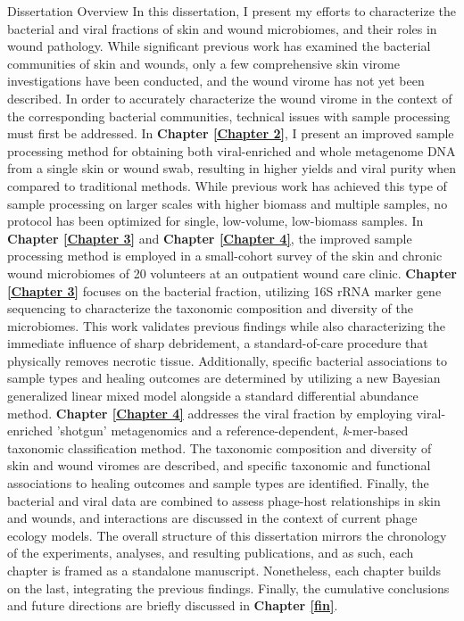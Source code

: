 \documentclass[oneside,12pt,final]{sty/ucthesis-CA2012}
\begin{document}
\begin{mainmatter}
\begin{section}{Dissertation Overview}
In this dissertation, I present my efforts to characterize the bacterial and viral fractions of skin and wound microbiomes, and their roles in wound pathology. While significant previous work has examined the bacterial communities of skin and wounds, only a few comprehensive skin virome investigations have been conducted, and the wound virome has not yet been described. In order to accurately characterize the wound virome in the context of the corresponding bacterial communities, technical issues with sample processing must first be addressed. In \textbf{Chapter \ref{Chapter 2}}, I present an improved sample processing method for obtaining both viral-enriched and whole metagenome DNA from a single skin or wound swab, resulting in higher yields and viral purity when compared to traditional methods. While previous work has achieved this type of sample processing on larger scales with higher biomass and multiple samples, no protocol has been optimized for single, low-volume, low-biomass samples. In \textbf{Chapter \ref{Chapter 3}} and \textbf{Chapter \ref{Chapter 4}}, the improved sample processing method is employed in a small-cohort survey of the skin and chronic wound microbiomes of 20 volunteers at an outpatient wound care clinic. \textbf{Chapter \ref{Chapter 3}} focuses on the bacterial fraction, utilizing 16S rRNA marker gene sequencing to characterize the taxonomic composition and diversity of the microbiomes. This work validates previous findings while also characterizing the immediate influence of sharp debridement, a standard-of-care procedure that physically removes necrotic tissue. Additionally, specific bacterial associations to sample types and healing outcomes are determined by utilizing a new Bayesian generalized linear mixed model alongside a standard differential abundance method. \textbf{Chapter \ref{Chapter 4}} addresses the viral fraction by employing viral-enriched 'shotgun' metagenomics and a reference-dependent, \textit{k}-mer-based taxonomic classification method. The taxonomic composition and diversity of skin and wound viromes are described, and specific taxonomic and functional associations to healing outcomes and sample types are identified. Finally, the bacterial and viral data are combined to assess phage-host relationships in skin and wounds, and interactions are discussed in the context of current phage ecology models. The overall structure of this dissertation mirrors the chronology of the experiments, analyses, and resulting publications, and as such, each chapter is framed as a standalone manuscript. Nonetheless, each chapter builds on the last, integrating the previous findings. Finally, the cumulative conclusions and future directions are briefly discussed in \textbf{Chapter \ref{fin}}.
\end{section} 


\end{mainmatter}
\end{document}

